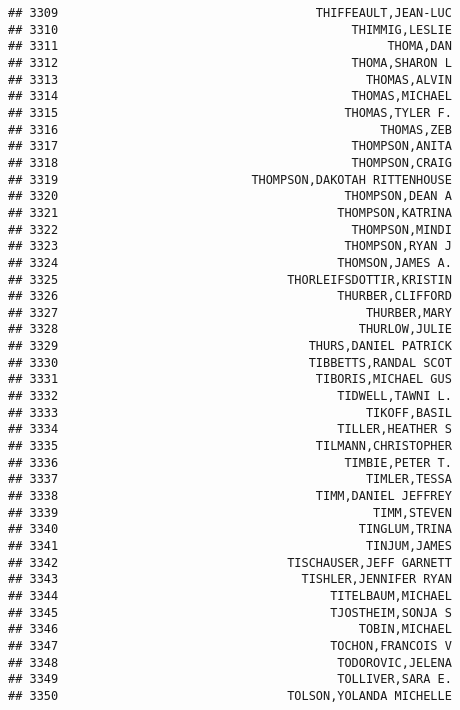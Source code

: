 \documentclass[
]{article}
\begin{document}
\begin{verbatim}
## 3309                                    THIFFEAULT,JEAN-LUC
## 3310                                         THIMMIG,LESLIE
## 3311                                              THOMA,DAN
## 3312                                         THOMA,SHARON L
## 3313                                           THOMAS,ALVIN
## 3314                                         THOMAS,MICHAEL
## 3315                                        THOMAS,TYLER F.
## 3316                                             THOMAS,ZEB
## 3317                                         THOMPSON,ANITA
## 3318                                         THOMPSON,CRAIG
## 3319                           THOMPSON,DAKOTAH RITTENHOUSE
## 3320                                        THOMPSON,DEAN A
## 3321                                       THOMPSON,KATRINA
## 3322                                         THOMPSON,MINDI
## 3323                                        THOMPSON,RYAN J
## 3324                                       THOMSON,JAMES A.
## 3325                                THORLEIFSDOTTIR,KRISTIN
## 3326                                       THURBER,CLIFFORD
## 3327                                           THURBER,MARY
## 3328                                          THURLOW,JULIE
## 3329                                   THURS,DANIEL PATRICK
## 3330                                   TIBBETTS,RANDAL SCOT
## 3331                                    TIBORIS,MICHAEL GUS
## 3332                                       TIDWELL,TAWNI L.
## 3333                                           TIKOFF,BASIL
## 3334                                       TILLER,HEATHER S
## 3335                                    TILMANN,CHRISTOPHER
## 3336                                        TIMBIE,PETER T.
## 3337                                           TIMLER,TESSA
## 3338                                    TIMM,DANIEL JEFFREY
## 3339                                            TIMM,STEVEN
## 3340                                          TINGLUM,TRINA
## 3341                                           TINJUM,JAMES
## 3342                                TISCHAUSER,JEFF GARNETT
## 3343                                  TISHLER,JENNIFER RYAN
## 3344                                      TITELBAUM,MICHAEL
## 3345                                      TJOSTHEIM,SONJA S
## 3346                                          TOBIN,MICHAEL
## 3347                                      TOCHON,FRANCOIS V
## 3348                                       TODOROVIC,JELENA
## 3349                                       TOLLIVER,SARA E.
## 3350                                TOLSON,YOLANDA MICHELLE

\end{verbatim}
\end{document}
